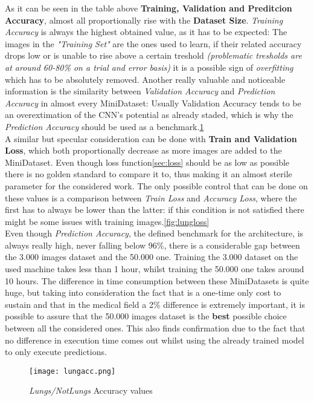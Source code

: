 \documentclass[../main.tex]{subfiles}
\begin{document}
As it can be seen in the table above \textbf{Training, Validation and Preditcion Accuracy}, almost all proportionally rise with the \textbf{Dataset Size}. \textit{Training Accuracy} is always the highest obtained value, as it has to be expected: The images in the \textit{"Training Set"} are the ones used to learn, if their related accuracy drops low or is unable to rise above a certain treshold \textit{(problematic tresholds are at around 60-80\% on a trial and error basis)} it is a possible sign of \textit{overfitting} which has to be absolutely removed. Another really valuable and noticeable information is the similarity between \textit{Validation Accuracy} and \textit{Prediction Accuracy} in almost every MiniDataset: Usually Validation Accuracy tends to be an overextimation of the CNN's potential as already staded, which is why the \textit{Prediction Accuracy} should be used as a benchmark.\ref{fig:lungacc}\\
A similar but specular consideration can be done with \textbf{Train and Validation Loss}, which both proportionally decrease as more images are added to the MiniDataset. Even though loss function\ref{sec:loss} should be as low as possible there is no golden standard to compare it to, thus making it an almost sterile parameter for the considered work. The only possible control that can be done on these values is a comparison between \textit{Train Loss} and \textit{Accuracy Loss}, where the first has to always be lower than the latter: if this condition is not satisfied there might be some issues with training images.\ref{fig:lungloss}\\
Even though \textit{Prediction Accuracy}, the defined benchmark for the architecture, is always really high, never falling below 96\%, there is a considerable gap between the 3.000 images dataset and the 50.000 one. Training the 3.000 dataset on the used machine takes less than 1 hour, whilst training the 50.000 one takes around 10 hours. The difference in time consumption between these MiniDatasets is quite huge, but taking into consideration the fact that is a one-time only cost to sustain and that in the medical field a 2\% difference is extremely important, it is possible to assure that the 50.000 images dataset is the \textbf{best} possible choice between all the considered ones. This also finds confirmation due to the fact that no difference in execution time comes out whilst using the already trained model to only execute predictions.

\begin{figure}[h!b]
	\centering
	\texttt{[image: lungacc.png]}
	\caption{\textit{Lungs/NotLungs} Accuracy values}
	\label{fig:lungacc}
\end{figure}
\end{document}
